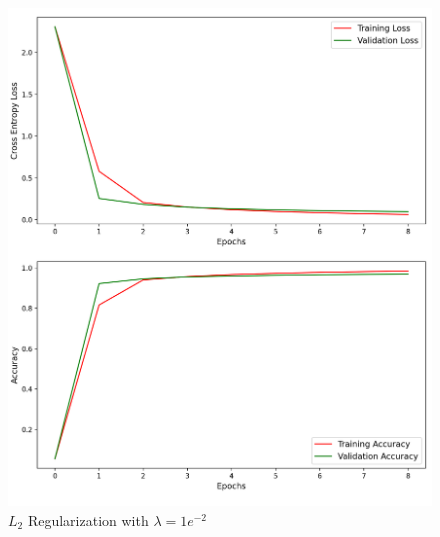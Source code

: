 \begin{figure}[!ht]
	\centering
	\includegraphics[width=1.0\textwidth]{./images/l2_e2.png}
	\caption{$L_2$ Regularization with $\lambda = 1e^{-2}$}
	\label{fig:l2_1e2}
\end{figure}


